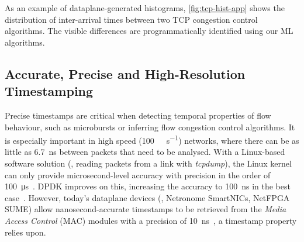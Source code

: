As an example of dataplane-generated histograms, \cref{fig:tcp-hist-app} shows the distribution of inter-arrival times between two TCP congestion control algorithms. The visible differences are programmatically identified using our ML algorithms.

\subsection{Accurate, Precise and High-Resolution Timestamping}

Precise timestamps are critical when detecting temporal properties of flow behaviour, such as microbursts or inferring flow congestion control algorithms.
It is especially important in high speed (\SI{100}{\giga\bit\per\second}) networks, where there can be as little as \SI{6.7}{\nano\second} between packets that need to be analysed.
With a Linux-based software solution (\eg, reading packets from a link with \emph{tcpdump}), the Linux kernel can only provide microsecond-level accuracy with precision in the order of \SI{100}{\micro\second}~\cite{kundel2020p4sta}.
DPDK improves on this, increasing the accuracy to \SI{100}{\nano\second} in the best case~\cite{primorac2017measure}.
However, today's dataplane devices (\eg, Netronome SmartNICs, NetFPGA SUME) allow nanosecond-accurate timestamps to be retrieved from the \emph{Media Access Control} (MAC) modules with a precision of \SI{10}{\nano\second}~\cite{kundel2020p4sta}, a timestamp property \seidr{} relies upon.


